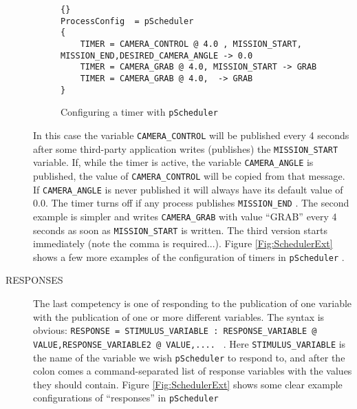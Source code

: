 \documentclass[a4paper,10pt]{article}
\newcommand{\Code}[1]{\texttt{#1} }
\newcommand{\code}[1]{\Code{#1} }
\begin{document}
\begin{description}
\begin{figure}[ht]
\begin{lstlisting}[]{}
ProcessConfig  = pScheduler
{
    TIMER = CAMERA_CONTROL @ 4.0 , MISSION_START,  MISSION_END,DESIRED_CAMERA_ANGLE -> 0.0
    TIMER = CAMERA_GRAB @ 4.0, MISSION_START -> GRAB
    TIMER = CAMERA_GRAB @ 4.0,  -> GRAB
}
\end{lstlisting}\caption{Configuring a timer with \code{pScheduler}}
\label{Fig:TIMER}
\end{figure}
In this case the variable \code{CAMERA\_CONTROL} will be published
every 4 seconds after some third-party application writes
(publishes) the \code{MISSION\_START} variable. If, while the
timer is active, the variable \code{CAMERA\_ANGLE} is published,
the value of \code{CAMERA\_CONTROL} will be copied from that
message. If \code{CAMERA\_ANGLE} is never published it will always
have its default value of $0.0$. The timer turns off if any
process publishes \code{MISSION\_END}. The second example is
simpler and writes \code{CAMERA\_GRAB} with value ``GRAB'' every 4
seconds as soon as \code{MISSION\_START} is written. The third
version starts immediately (note the comma is required...). Figure
\ref{Fig:SchedulerExt} shows a few more examples of the
configuration of timers in  \code{pScheduler}.
\item[RESPONSES] The last competency is one of responding to the
publication of one variable with the publication of one or more
different variables. The syntax is obvious: \code{RESPONSE =
STIMULUS\_VARIABLE : RESPONSE\_VARIABLE @
VALUE,RESPONSE\_VARIABLE2 @ VALUE,....  }. Here
\code{STIMULUS\_VARIABLE} is the name of the variable we wish
\code{pScheduler} to respond to, and after the colon comes a
command-separated list of response variables with the values they
should contain. Figure \ref{Fig:SchedulerExt} shows some clear
example configurations of ``responses'' in \code{pScheduler}
\end{description}
\end{document}
